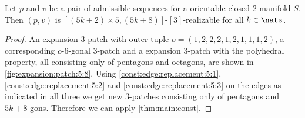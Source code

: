 \clearpage
\begin{theorem}
  Let $p$ and $v$ be a pair of admissible sequences for a orientable closed $2$-manifold $S$. Then $(p, v)$ is $[(5k + 2) \times 5, (5k+8)]$-$[3]$-realizable for all $k \in \nats$.
  \begin{proof}
    An expansion $3$-patch with outer tuple $o = (1, 2, 2, 2, 1, 2, 1, 1, 1, 2)$, a corresponding $o$-$6$-gonal $3$-patch and a expansion $3$-patch with the polyhedral property, all consisting only of pentagons and octagons, are shown in \autoref{fig:expansion:patch:5:8}. Using \autoref{const:edge:replacement:5:1}, \autoref{const:edge:replacement:5:2} and \autoref{const:edge:replacement:5:3} on the edges as indicated in all three we get new $3$-patches consisting only of pentagons and $5k + 8$-gons. Therefore we can apply \autoref{thm:main:const}.
  \end{proof}
\end{theorem}

